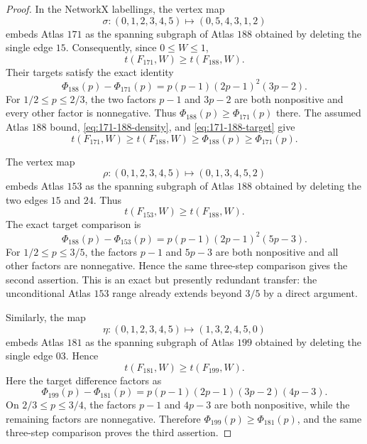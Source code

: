 \documentclass[11pt]{article}
\begin{document}
\begin{proof}
In the NetworkX labellings, the vertex map
\[
 \sigma:(0,1,2,3,4,5)\longmapsto(0,5,4,3,1,2)
\]
embeds Atlas $171$ as the spanning subgraph of Atlas $188$ obtained by
deleting the single edge $15$.  Consequently, since $0\leq W\leq1$,
\begin{equation}
 t(F_{171},W)\geq t(F_{188},W).                 \label{eq:171-188-density}
\end{equation}
Their targets satisfy the exact identity
\begin{equation}
 \Phi_{188}(p)-\Phi_{171}(p)
 =p(p-1)(2p-1)^2(3p-2).                        \label{eq:171-188-target}
\end{equation}
For $1/2\leq p\leq2/3$, the two factors $p-1$ and $3p-2$ are both
nonpositive and every other factor is nonnegative.  Thus
$\Phi_{188}(p)\geq\Phi_{171}(p)$ there.  The assumed Atlas $188$ bound,
\eqref{eq:171-188-density}, and \eqref{eq:171-188-target} give
\[
 t(F_{171},W)\geq t(F_{188},W)
 \geq\Phi_{188}(p)\geq\Phi_{171}(p).
\]

The vertex map
\[
 \rho:(0,1,2,3,4,5)\longmapsto(0,1,3,4,5,2)
\]
embeds Atlas $153$ as the spanning subgraph of Atlas $188$ obtained by
deleting the two edges $15$ and $24$.  Thus
\begin{equation}
 t(F_{153},W)\geq t(F_{188},W).                 \label{eq:153-188-density}
\end{equation}
The exact target comparison is
\begin{equation}
 \Phi_{188}(p)-\Phi_{153}(p)
 =p(p-1)(2p-1)^2(5p-3).                        \label{eq:153-188-target}
\end{equation}
For $1/2\leq p\leq3/5$, the factors $p-1$ and $5p-3$ are both
nonpositive and all other factors are nonnegative.  Hence the same
three-step comparison gives the second assertion.  This is an exact but
presently redundant transfer: the unconditional Atlas $153$ range already
extends beyond $3/5$ by a direct argument.

Similarly, the map
\[
 \eta:(0,1,2,3,4,5)\longmapsto(1,3,2,4,5,0)
\]
embeds Atlas $181$ as the spanning subgraph of Atlas $199$ obtained by
deleting the single edge $03$.  Hence
\begin{equation}
 t(F_{181},W)\geq t(F_{199},W).                 \label{eq:181-199-density}
\end{equation}
Here the target difference factors as
\begin{equation}
 \Phi_{199}(p)-\Phi_{181}(p)
 =p(p-1)(2p-1)(3p-2)(4p-3).                    \label{eq:181-199-target}
\end{equation}
On $2/3\leq p\leq3/4$, the factors $p-1$ and $4p-3$ are both
nonpositive, while the remaining factors are nonnegative.  Therefore
$\Phi_{199}(p)\geq\Phi_{181}(p)$, and the same three-step comparison proves
the third assertion.
\end{proof}
\end{document}
